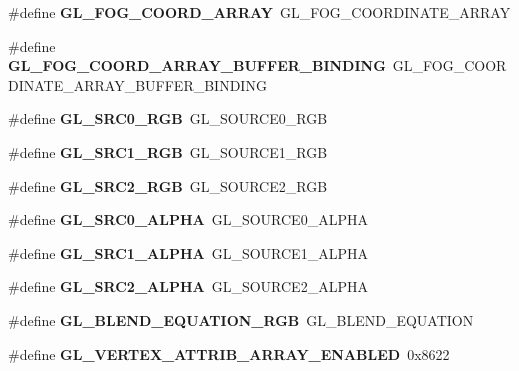 \begin{DoxyCompactItemize}
\item 
\#define {\bfseries G\+L\+\_\+\+F\+O\+G\+\_\+\+C\+O\+O\+R\+D\+\_\+\+A\+R\+R\+A\+Y}~G\+L\+\_\+\+F\+O\+G\+\_\+\+C\+O\+O\+R\+D\+I\+N\+A\+T\+E\+\_\+\+A\+R\+R\+A\+Y\label{_s_d_l__opengl_8h_a1d2616b400f9ea5d82f5ce6dfd2e53b5}

\item 
\#define {\bfseries G\+L\+\_\+\+F\+O\+G\+\_\+\+C\+O\+O\+R\+D\+\_\+\+A\+R\+R\+A\+Y\+\_\+\+B\+U\+F\+F\+E\+R\+\_\+\+B\+I\+N\+D\+I\+N\+G}~G\+L\+\_\+\+F\+O\+G\+\_\+\+C\+O\+O\+R\+D\+I\+N\+A\+T\+E\+\_\+\+A\+R\+R\+A\+Y\+\_\+\+B\+U\+F\+F\+E\+R\+\_\+\+B\+I\+N\+D\+I\+N\+G\label{_s_d_l__opengl_8h_acf2ea0fb7bfbb4a5d030d987d88407d1}

\item 
\#define {\bfseries G\+L\+\_\+\+S\+R\+C0\+\_\+\+R\+G\+B}~G\+L\+\_\+\+S\+O\+U\+R\+C\+E0\+\_\+\+R\+G\+B\label{_s_d_l__opengl_8h_a1631beb4d4744c2dbb985bd6d3d1964c}

\item 
\#define {\bfseries G\+L\+\_\+\+S\+R\+C1\+\_\+\+R\+G\+B}~G\+L\+\_\+\+S\+O\+U\+R\+C\+E1\+\_\+\+R\+G\+B\label{_s_d_l__opengl_8h_a3f37dbd949df78380b1ad8ba1cb84ee6}

\item 
\#define {\bfseries G\+L\+\_\+\+S\+R\+C2\+\_\+\+R\+G\+B}~G\+L\+\_\+\+S\+O\+U\+R\+C\+E2\+\_\+\+R\+G\+B\label{_s_d_l__opengl_8h_a3d502987f54308264b36939a4d2bb3e2}

\item 
\#define {\bfseries G\+L\+\_\+\+S\+R\+C0\+\_\+\+A\+L\+P\+H\+A}~G\+L\+\_\+\+S\+O\+U\+R\+C\+E0\+\_\+\+A\+L\+P\+H\+A\label{_s_d_l__opengl_8h_abdf71dbfa895309419063f5ed71833e8}

\item 
\#define {\bfseries G\+L\+\_\+\+S\+R\+C1\+\_\+\+A\+L\+P\+H\+A}~G\+L\+\_\+\+S\+O\+U\+R\+C\+E1\+\_\+\+A\+L\+P\+H\+A\label{_s_d_l__opengl_8h_a35a28830b374907100ab8886c885bbaa}

\item 
\#define {\bfseries G\+L\+\_\+\+S\+R\+C2\+\_\+\+A\+L\+P\+H\+A}~G\+L\+\_\+\+S\+O\+U\+R\+C\+E2\+\_\+\+A\+L\+P\+H\+A\label{_s_d_l__opengl_8h_af399fc8aedb7069dda597b490b18fa1c}

\item 
\#define {\bfseries G\+L\+\_\+\+B\+L\+E\+N\+D\+\_\+\+E\+Q\+U\+A\+T\+I\+O\+N\+\_\+\+R\+G\+B}~G\+L\+\_\+\+B\+L\+E\+N\+D\+\_\+\+E\+Q\+U\+A\+T\+I\+O\+N\label{_s_d_l__opengl_8h_a2d24de280ec5f40a3c9e42f488ba0236}

\item 
\#define {\bfseries G\+L\+\_\+\+V\+E\+R\+T\+E\+X\+\_\+\+A\+T\+T\+R\+I\+B\+\_\+\+A\+R\+R\+A\+Y\+\_\+\+E\+N\+A\+B\+L\+E\+D}~0x8622\label{_s_d_l__opengl_8h_a5ec11ddfc4685d748eb5aa0f2ae6b8c7}


\end{DoxyCompactItemize}
